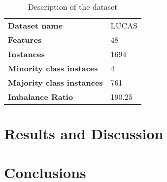 \documentclass[parskip=full]{scrartcl}
\begin{document}
\begin{table}[H]
	\centering
	\begin{tabular}{ll}
		\toprule
		\textbf{Dataset name}             &  				 LUCAS \\
		\textbf{Features}                 &             48 \\
		\textbf{Instances}                &           1694 \\
		\textbf{Minority class instaces}  &              4 \\
		\textbf{Majority class instances} &            761 \\
		\textbf{Imbalance Ratio}          &         190.25 \\
	\bottomrule
	\end{tabular}
	\caption{\label{tab:datasets}Description of the dataset}
\end{table}

\section{Results and Discussion}

\section{Conclusions}





\end{document}
